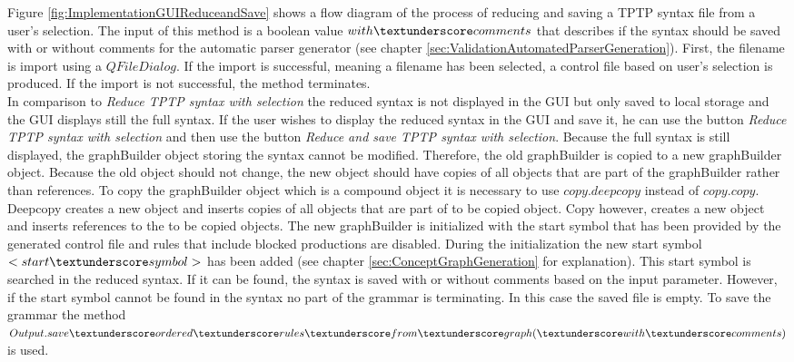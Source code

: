 Figure \ref{fig:ImplementationGUIReduceandSave} shows a flow diagram of the process of reducing and saving a \ac{TPTP} syntax file from a user's selection.
The input of this method is a boolean value $with\textunderscore comments$ that describes if the syntax should be saved with or without comments for the automatic parser generator (see chapter \ref{sec:ValidationAutomatedParserGeneration}). 
First, the filename is import using a $QFileDialog$.
If the import is successful, meaning a filename has been selected, a control file based on user's selection is produced. If the import is not successful, the method terminates. \\
In comparison to \textit{Reduce \ac{TPTP} syntax with selection} the reduced syntax is not displayed in the GUI but only saved to local storage and the GUI displays still the full syntax. If the user wishes to display the reduced syntax in the GUI and save it, he can use the button \textit{Reduce \ac{TPTP} syntax with selection} and then use the button \textit{Reduce and save \ac{TPTP} syntax with selection}.
Because the full syntax is still displayed, the graphBuilder object storing the syntax cannot be modified. Therefore, the old graphBuilder is copied to a new graphBuilder object. Because the old object should not change, the new object should have copies of all objects that are part of the graphBuilder rather than references.
To copy the graphBuilder object which is a compound object it is necessary to use $copy.deepcopy$ instead of $copy.copy$. Deepcopy creates a new object and inserts copies of all objects that are part of to be copied object. Copy however, creates a new object and inserts references to the to be copied objects. 
The new graphBuilder is initialized with the start symbol that has been provided by the generated control file and rules that include blocked productions are disabled. During the initialization the new start symbol $<start\textunderscore symbol>$ has been added (see chapter \ref{sec:ConceptGraphGeneration} for explanation).
This start symbol is searched in the reduced syntax.
If it can be found, the syntax is saved with or without comments based on the input parameter.
However, if the start symbol cannot be found in the syntax no part of the grammar is terminating.
In this case the saved file is empty.
To save the grammar the method $Output.save\textunderscore ordered\textunderscore rules\textunderscore from\textunderscore graph(\textunderscore with\textunderscore comments)$ is used.

